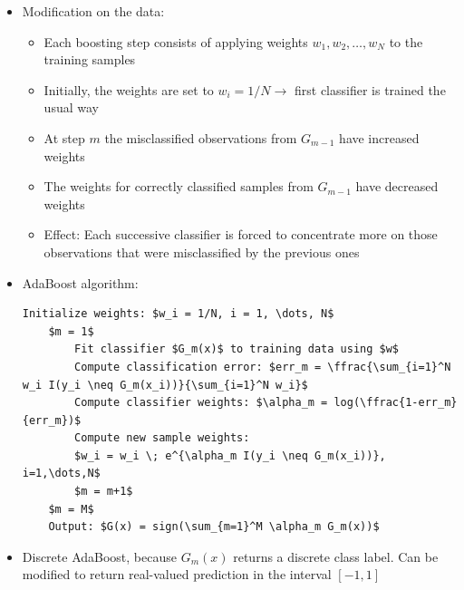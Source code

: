 \begin{itemize}
\begin{figure}[H]
        \end{figure}
    \item
        Modification on the data:
        \begin{itemize}
            \item
                Each boosting step consists of applying weights $w_1, w_2, \dots, w_N$ to the training samples
            \item
                Initially, the weights are set to $w_i = 1/N \rightarrow$ first classifier is trained the usual way
            \item
                At step $m$ the misclassified observations from $G_{m-1}$ have increased weights
            \item
                The weights for correctly classified samples from $G_{m-1}$ have decreased weights
            \item
                Effect: Each successive classifier is forced to concentrate more on those observations that were misclassified by the previous ones
        \end{itemize}
    \item
        AdaBoost algorithm:
\begin{lstlisting}[mathescape]
    Initialize weights: $w_i = 1/N, i = 1, \dots, N$
    $m = 1$
        Fit classifier $G_m(x)$ to training data using $w$
        Compute classification error: $err_m = \ffrac{\sum_{i=1}^N w_i I(y_i \neq G_m(x_i))}{\sum_{i=1}^N w_i}$
        Compute classifier weights: $\alpha_m = log(\ffrac{1-err_m}{err_m})$
        Compute new sample weights:
        $w_i = w_i \; e^{\alpha_m I(y_i \neq G_m(x_i))}, i=1,\dots,N$
        $m = m+1$
    $m = M$
    Output: $G(x) = sign(\sum_{m=1}^M \alpha_m G_m(x))$
\end{lstlisting}
    \item
        Discrete AdaBoost, because $G_m(x)$ returns a discrete class label. Can be modified to return real-valued prediction in the interval $[-1, 1]$
\end{itemize}
